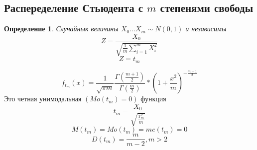 \documentclass[14pt]{extarticle}
\newtheorem{definition}{Определение}
\begin{document}
\subsection{Распеределение Стьюдента с $m$ степенями свободы}
\begin{definition}
	Случайнык величины $X_0 \dots X_{m} \sim N(0,1)$ 
	и независимы 
	\begin{equation}
	Z = \frac{X_0}{\sqrt{\frac{1}{m} \sum_{i=1}^{m}X_{i}^2} }
	\end{equation} 
	\begin{equation}
	Z = t_{m}
	\end{equation} 
\end{definition}
\begin{equation}
f_{t_{m}}(x)  = \frac{1}{\sqrt{\pi m} } \frac{\Gamma(\frac{m+1}{2})}{\Gamma(\frac{m}{2})} * \left(1 + \frac{x^2}{m}\right)^{- \frac{m+1}{2}}
\end{equation} 
Это четная унимодальная $(Mo(t_{m}) = 0)$ функция
\begin{equation}
t_{m} = \frac{X_0}{\sqrt{\frac{\chi_{m}^2}{m}} }
\end{equation} 
\begin{equation}
M(t_{m}) = Mo(t_{m}) = me(t_{m}) = 0
\end{equation} 
\begin{equation}
D(t_{m}) =  \frac{m}{m - 2} , m > 2
\end{equation} 
\end{document}

